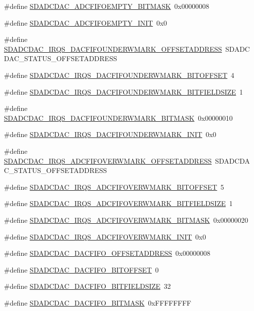 \begin{DoxyCompactItemize}
\item 
\#define \hyperlink{a00569_ae5cff2549e851783753ebd5f1689256c}{SDADCDAC\_\-ADCFIFOEMPTY\_\-BITMASK}~0x00000008
\item 
\#define \hyperlink{a00569_a5f358ec48559ceb0dfb5b119371fedda}{SDADCDAC\_\-ADCFIFOEMPTY\_\-INIT}~0x0
\item 
\#define \hyperlink{a00569_a96966950d793ed93dd234416a841cfd6}{SDADCDAC\_\-IRQS\_\-DACFIFOUNDERWMARK\_\-OFFSETADDRESS}~SDADCDAC\_\-STATUS\_\-OFFSETADDRESS
\item 
\#define \hyperlink{a00569_a7810a7def88ee31cab31015a1bd415e6}{SDADCDAC\_\-IRQS\_\-DACFIFOUNDERWMARK\_\-BITOFFSET}~4
\item 
\#define \hyperlink{a00569_a5d109290b1437dd27404fc8aff67ab9a}{SDADCDAC\_\-IRQS\_\-DACFIFOUNDERWMARK\_\-BITFIELDSIZE}~1
\item 
\#define \hyperlink{a00569_a0ac663ce6c32d3bf3cc0f109046a103e}{SDADCDAC\_\-IRQS\_\-DACFIFOUNDERWMARK\_\-BITMASK}~0x00000010
\item 
\#define \hyperlink{a00569_a86e7968f12c944e778e505432a89cac4}{SDADCDAC\_\-IRQS\_\-DACFIFOUNDERWMARK\_\-INIT}~0x0
\item 
\#define \hyperlink{a00569_a6ea5b91430ab312671763824b16ff4c5}{SDADCDAC\_\-IRQS\_\-ADCFIFOVERWMARK\_\-OFFSETADDRESS}~SDADCDAC\_\-STATUS\_\-OFFSETADDRESS
\item 
\#define \hyperlink{a00569_ad3b3d3938535afb7c105480fd9b0a469}{SDADCDAC\_\-IRQS\_\-ADCFIFOVERWMARK\_\-BITOFFSET}~5
\item 
\#define \hyperlink{a00569_a0530842330271838b4ca5be0759145c4}{SDADCDAC\_\-IRQS\_\-ADCFIFOVERWMARK\_\-BITFIELDSIZE}~1
\item 
\#define \hyperlink{a00569_a57fc3f59190badc05e530c4f998917a1}{SDADCDAC\_\-IRQS\_\-ADCFIFOVERWMARK\_\-BITMASK}~0x00000020
\item 
\#define \hyperlink{a00569_aa3c23856f0ae6b793c3b1b23881d467b}{SDADCDAC\_\-IRQS\_\-ADCFIFOVERWMARK\_\-INIT}~0x0
\item 
\#define \hyperlink{a00569_a9d3c0932d97a99a89e8c9df549da1d92}{SDADCDAC\_\-DACFIFO\_\-OFFSETADDRESS}~0x00000008
\item 
\#define \hyperlink{a00569_a89e1695f274a583c59d97c00fe30eaee}{SDADCDAC\_\-DACFIFO\_\-BITOFFSET}~0
\item 
\#define \hyperlink{a00569_a79f46e59300b073badef8dda7c5d66f3}{SDADCDAC\_\-DACFIFO\_\-BITFIELDSIZE}~32
\item 
\#define \hyperlink{a00569_ad71f10331d0a7ce4764df0cf36948618}{SDADCDAC\_\-DACFIFO\_\-BITMASK}~0xFFFFFFFF

\end{DoxyCompactItemize}
